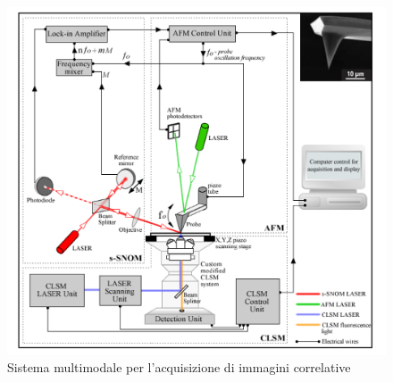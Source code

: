 \documentclass[../main.tex]{subfiles}
\begin{document}
\begin{figure}[h]
\centering
\includegraphics[keepaspectratio, height=\linewidth]{images/multimodal_system.jpg}
\caption[Sistema multimodale per l'acquisizione di immagini correlative]{
	Sistema multimodale per l'acquisizione di immagini correlative \cite{stanciu_2017}}
\label{fig:multimodal_system}
\end{figure}
\end{document}
